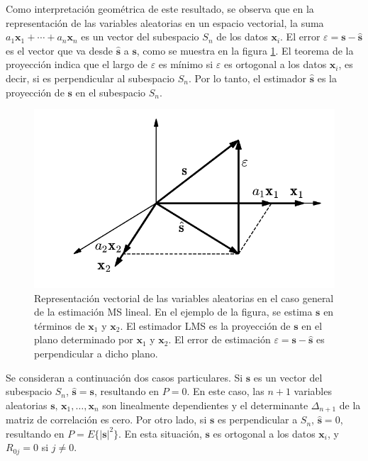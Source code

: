 \documentclass[a4paper]{report}
\newcommand{\x}{\mathbf{x}}
\newcommand{\s}{\mathbf{s}}
\begin{document}
Como interpretación geométrica de este resultado, se observa que en la representación de las variables aleatorias en un espacio vectorial, la suma \(a_1\x_1+\cdots+a_n\x_n\) es un vector del subespacio \(S_n\) de los datos \(\x_i\). El error \(\varepsilon=\s-\hat{\s}\) es el vector que va desde \(\hat{\s}\) a \(\s\), como se muestra en la figura \ref{fig:mse_linear_general_case}. El teorema de la proyección indica que el largo de \(\varepsilon\) es mínimo si \(\varepsilon\) es ortogonal a los datos \(\x_i\), es decir, si es perpendicular al subespacio \(S_n\). Por lo tanto, el estimador \(\hat{\s}\) es la proyección de \(\s\) en el subespacio \(S_n\).
\begin{figure}[!htb]
  \begin{minipage}[c]{0.52\textwidth}
    \includegraphics[width=\textwidth]{figuras/mse_linear_general_case.pdf}
  \end{minipage}\hfill
  \begin{minipage}[c]{0.45\textwidth}
    \caption{
       Representación vectorial de las variables aleatorias en el caso general de la estimación MS lineal. En el ejemplo de la figura, se estima \(\s\) en términos de \(\x_1\) y \(\x_2\). El estimador LMS es la proyección de \(\s\) en el plano determinado por \(\x_1\) y \(\x_2\). El error de estimación \(\varepsilon=\s-\hat{\s}\) es perpendicular a dicho plano.
    }\label{fig:mse_linear_general_case}
  \end{minipage}
\end{figure}

Se consideran a continuación dos casos particulares. Si \(\s\) es un vector del subespacio \(S_n\), \(\hat{\s}=\s\), resultando en \(P=0\). En este caso, las \(n+1\) variables aleatorias \(\s,\,\x_1,\dots,\x_n\) son linealmente dependientes y el determinante \(\Delta_{n+1}\) de la matriz de correlación es cero. Por otro lado, si \(\s\) es perpendicular a \(S_n\), \(\hat{\s}=0\), resultando en \(P=E\{|\s|^2\}\). En esta situación, \(\s\) es ortogonal a los datos \(\x_i\), y \(R_{0j}=0\) si \(j\neq0\).
\end{document}
